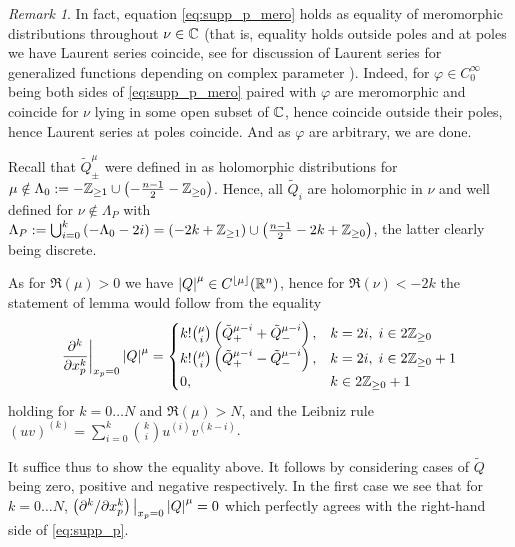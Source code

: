 \documentclass[10pt]{article} %
\theoremstyle{definition}
\theoremstyle{remark}
\newtheorem*{remark}{Remark}
\begin{document}
\begin{remark}
	In fact, equation \eqref{eq:supp_p_mero} holds as equality of meromorphic distributions throughout $\nu\in\mathbb{C}$ (that is,
	equality holds outside poles and at poles we have Laurent series coincide, see \cite[ch. I, A.2.3]{gelfand1980distribution}
	for discussion of Laurent series for generalized functions depending on complex parameter
	). Indeed, for $\varphi\in C^{\infty}_0$ being
	both sides of \eqref{eq:supp_p_mero} paired with $\varphi$ are meromorphic and coincide for $\nu$ lying in some open
	subset of $\mathbb{C}$, hence coincide outside their poles, hence Laurent series at poles coincide. And as $\varphi$ are arbitrary,
	we are done.
\end{remark}
\begin{myproof}
	Recall that $\tilde{Q}^{\mu}_{\pm}$ were defined in \cite{gelfand1980distribution} as holomorphic distributions for
	$\mu\notin\Lambda_0:=-\mathbb{Z}_{\ge1}\cup\left( -\frac{n-1}{2}-\mathbb{Z}_{\ge0} \right)$. Hence, all $\tilde{Q}_i$ are holomorphic
	in $\nu$ and well defined for $\nu\notin\Lambda_P$ with $\Lambda_P:=\bigcup_{i=0}^k\left(-\Lambda_0-2i\right)=
	\left( -2k+\mathbb{Z}_{\ge1} \right)\cup\left( \frac{n-1}{2}-2k+\mathbb{Z}_{\ge0} \right)$, the latter clearly
	being discrete.

	As for $\Re(\mu)>0$ we have $\left|Q\right|^{\mu}\in C^{\left\lfloor\mu\right\rfloor}(\mathbb{R}^n)$, hence
	for $\Re(\nu)<-2k$ the statement of lemma would follow
	from the equality
	\begin{equation}\frac{\partial^k}{\partial x_p^k}\bigg|_{x_p=0}\left|Q\right|^{\mu}=\begin{cases}
			k!\binom{\mu}{i}\left(\tilde{Q}_+^{\mu-i}+\tilde{Q}_-^{\mu-i}\right),&k=2i,\;i\in2\mathbb{Z}_{\ge0}\\
			k!\binom{\mu}{i}\left(\tilde{Q}_+^{\mu-i}-\tilde{Q}_-^{\mu-i}\right),&k=2i,\;i\in2\mathbb{Z}_{\ge0}+1\\
			0,&k\in2\mathbb{Z}_{\ge0}+1
	\label{eq:supp_p}
	\end{cases}\end{equation}
	holding for $k=0\dots N$ and $\Re(\mu)>N$,
	and the Leibniz rule $(uv)^{(k)}=\sum_{i=0}^k\binom{k}{i}u^{(i)}v^{(k-i)}$.

	It suffice thus to show the equality above. It follows by considering cases of $\tilde{Q}$ being zero, positive and negative
	respectively. In the first case we see that for $k=0\dots N$,
	$\left(\partial^k/\partial x_p^k\right)\big|_{x_p=0}\left|Q\right|^{\mu}=0
	$ which perfectly agrees with the right-hand side of \eqref{eq:supp_p}.


\end{myproof}
\end{document}
